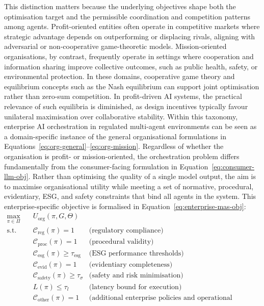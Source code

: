 \documentclass[oneside,10pt]{swissi}
\begin{document}
This distinction matters because the underlying objectives shape both the optimisation target and the permissible coordination and competition patterns among agents. Profit-oriented entities often operate in competitive markets where strategic advantage depends on outperforming or displacing rivals, aligning with adversarial or non-cooperative game-theoretic models. Mission-oriented organisations, by contrast, frequently operate in settings where cooperation and information sharing improve collective outcomes, such as public health, safety, or environmental protection. In these domains, cooperative game theory and equilibrium concepts such as the Nash equilibrium can support joint optimisation rather than zero-sum competition. In profit-driven AI systems, the practical relevance of such equilibria is diminished, as design incentives typically favour unilateral maximisation over collaborative stability. Within this taxonomy, enterprise AI orchestration in regulated multi-agent environments can be seen as a domain-specific instance of the general organisational formulations in Equations~\eqref{eq:org-general}--\eqref{eq:org-mission}. Regardless of whether the organisation is profit- or mission-oriented, the orchestration problem differs fundamentally from the consumer-facing formulation in Equation~\eqref{eq:consumer-llm-obj}. Rather than optimising the quality of a single model output, the aim is to maximise organisational utility while meeting a set of normative, procedural, evidentiary, ESG, and safety constraints that bind all agents in the system. This enterprise-specific objective is formalised in Equation~\eqref{eq:enterprise-mas-obj}:
\begin{align}
\max_{\pi \in \Pi} \quad & U_{\text{org}}(\pi, G, \Theta) \label{eq:enterprise-mas-obj} \\
\text{s.t.} \quad
& \mathcal{C}_{\text{reg}}(\pi) = 1 & \text{(regulatory compliance)} \nonumber \\
& \mathcal{C}_{\text{proc}}(\pi) = 1 & \text{(procedural validity)} \nonumber \\
& \mathcal{C}_{\text{esg}}(\pi) \geq \tau_{\text{esg}} & \text{(ESG performance thresholds)} \nonumber \\
& \mathcal{C}_{\text{evid}}(\pi) = 1 & \text{(evidentiary completeness)} \nonumber \\
& \mathcal{C}_{\text{safety}}(\pi) \geq \tau_{\sigma} & \text{(safety and risk minimisation)} \nonumber \\
& L(\pi) \leq \tau_l & \text{(latency bound for execution)} \nonumber \\
& \mathcal{C}_{\text{other}}(\pi) = 1 & \text{(additional enterprise policies and operational constraints)} \nonumber
\end{align}
\end{document}
